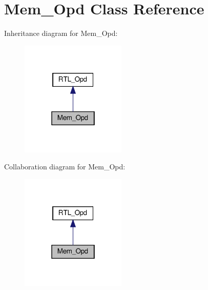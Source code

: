 \hypertarget{classMem__Opd}{}\section{Mem\+\_\+\+Opd Class Reference}
\label{classMem__Opd}


Inheritance diagram for Mem\+\_\+\+Opd\+:
\nopagebreak
\begin{figure}[H]
\begin{center}
\leavevmode
\includegraphics[width=142pt]{classMem__Opd__inherit__graph}
\end{center}
\end{figure}


Collaboration diagram for Mem\+\_\+\+Opd\+:
\nopagebreak
\begin{figure}[H]
\begin{center}
\leavevmode
\includegraphics[width=142pt]{classMem__Opd__coll__graph}
\end{center}
\end{figure}
